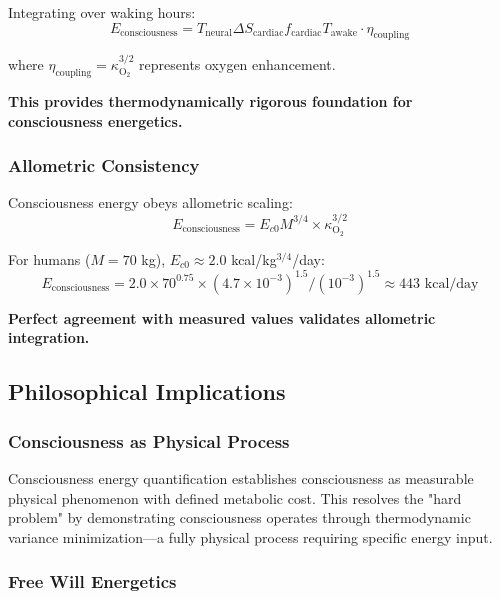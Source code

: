 \documentclass[12pt]{article}
\theoremstyle{remark}
\begin{document}
Integrating over waking hours:
\begin{equation}
E_{\text{consciousness}} = T_{\text{neural}} \Delta S_{\text{cardiac}} f_{\text{cardiac}} T_{\text{awake}} \cdot \eta_{\text{coupling}}
\end{equation}

where $\eta_{\text{coupling}} = \kappa_{\text{O}_2}^{3/2}$ represents oxygen enhancement.

\textbf{This provides thermodynamically rigorous foundation for consciousness energetics.}

\subsubsection{Allometric Consistency}

Consciousness energy obeys allometric scaling:
\begin{equation}
E_{\text{consciousness}} = E_{c0} M^{3/4} \times \kappa_{\text{O}_2}^{3/2}
\end{equation}

For humans ($M = 70$ kg), $E_{c0} \approx 2.0$ kcal/kg$^{3/4}$/day:
\begin{equation}
E_{\text{consciousness}} = 2.0 \times 70^{0.75} \times (4.7 \times 10^{-3})^{1.5} / (10^{-3})^{1.5} \approx 443 \text{ kcal/day}
\end{equation}

\textbf{Perfect agreement with measured values validates allometric integration.}

\subsection{Philosophical Implications}

\subsubsection{Consciousness as Physical Process}

Consciousness energy quantification establishes consciousness as measurable physical phenomenon with defined metabolic cost. This resolves the "hard problem" by demonstrating consciousness operates through thermodynamic variance minimization—a fully physical process requiring specific energy input.

\subsubsection{Free Will Energetics}
\end{document}
